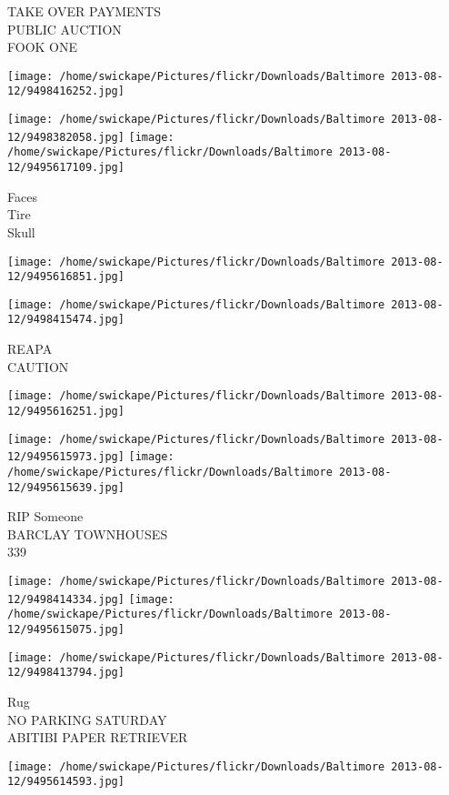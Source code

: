 \documentclass[10pt,letterpaper]{article}
\begin{document}
TAKE OVER PAYMENTS\\
PUBLIC AUCTION\\
FOOK ONE
\pagebreak

\texttt{[image: /home/swickape/Pictures/flickr/Downloads/Baltimore 2013-08-12/9498416252.jpg]}

\vspace{0.25in}
\texttt{[image: /home/swickape/Pictures/flickr/Downloads/Baltimore 2013-08-12/9498382058.jpg]}
\texttt{[image: /home/swickape/Pictures/flickr/Downloads/Baltimore 2013-08-12/9495617109.jpg]}

Faces\\
Tire\\
Skull
\pagebreak

\texttt{[image: /home/swickape/Pictures/flickr/Downloads/Baltimore 2013-08-12/9495616851.jpg]}

\vspace{0.25in}
\texttt{[image: /home/swickape/Pictures/flickr/Downloads/Baltimore 2013-08-12/9498415474.jpg]}

REAPA\\
CAUTION
\pagebreak

\texttt{[image: /home/swickape/Pictures/flickr/Downloads/Baltimore 2013-08-12/9495616251.jpg]}

\vspace{0.25in}
\texttt{[image: /home/swickape/Pictures/flickr/Downloads/Baltimore 2013-08-12/9495615973.jpg]}
\texttt{[image: /home/swickape/Pictures/flickr/Downloads/Baltimore 2013-08-12/9495615639.jpg]}

RIP Someone\\
BARCLAY TOWNHOUSES\\
339
\pagebreak

\texttt{[image: /home/swickape/Pictures/flickr/Downloads/Baltimore 2013-08-12/9498414334.jpg]}
\texttt{[image: /home/swickape/Pictures/flickr/Downloads/Baltimore 2013-08-12/9495615075.jpg]}

\vspace{0.25in}
\texttt{[image: /home/swickape/Pictures/flickr/Downloads/Baltimore 2013-08-12/9498413794.jpg]}

Rug\\
NO PARKING SATURDAY\\
ABITIBI PAPER RETRIEVER
\pagebreak

\texttt{[image: /home/swickape/Pictures/flickr/Downloads/Baltimore 2013-08-12/9495614593.jpg]}
\end{document}
